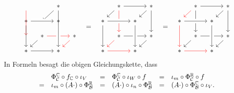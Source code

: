 \documentclass[a4paper,10pt]{article}
\begin{document}
\[\begin{array}{cccccccc}
\begin{tikzcd}[row sep = 10, column sep = 10]
        \arrow[dd, red]
      & {}
      & *
        \arrow[ld]
        \arrow[dd]
      \\
        *
        \arrow[rr, crossing over]
        \arrow[dd]
      & {}
      & *
        \arrow[dd]
      & {}
      \\
        {}
      & *
        \arrow[rr, red]
        \arrow[ld]
      & {}
      & *
        \arrow[ld, red]
      \\
        *
        \arrow[rr]
      & {}
      & *
        \arrow[from=uu, crossing over]
      & {}
    \end{tikzcd}
    & = &
    \begin{tikzcd}[row sep = 10, column sep = 10]
        {}
      & *
        \arrow[rr]
        \arrow[ld]
        \arrow[dd, red]
      & {}
      & *
        \arrow[ld]
        \arrow[dd]
      \\
        *
        \arrow[rr, crossing over]
        \arrow[dd]
      & {}
      & *
        \arrow[dd]
      & {}
      \\
        {}
      & *
        \arrow[rr]
        \arrow[ld,red]
      & {}
      & *
        \arrow[ld]
      \\
        *
        \arrow[rr,red]
      & {}
      & *
        \arrow[from=uu, crossing over]
      & {}
    \end{tikzcd}
    & = &
    \begin{tikzcd}[row sep = 10, column sep = 10]
        {}
      & *
        \arrow[rr]
        \arrow[ld, red]
        \arrow[dd]
      & {}
      & *
        \arrow[ld]
        \arrow[dd]
      \\
        *
        \arrow[rr, crossing over]
        \arrow[dd, red]
      & {}
      & *
        \arrow[dd]
      & {}
      \\
        {}
      & *
        \arrow[rr]
        \arrow[ld]
      & {}
      & *
        \arrow[ld]
      \\
        *
        \arrow[rr,red]
      & {}
      & *
        \arrow[from=uu, crossing over]
      & {}
    \end{tikzcd}
  \end{array}
\]
In Formeln besagt die obigen Gleichungskette, dass
\[
\begin{array}{clclcl}
    & \Phi^{\mathbb{C}}_{\mathcal{C}} \circ f_{\mathbb{C}} \circ \iota_V
  &=&  \Phi^{\mathbb{C}}_{\mathcal{C}} \circ \iota_W \circ f
  &=&  \iota_m \circ \Phi^{\mathbb{R}}_{\mathcal{C}} \circ f \\
   =&  \iota_m \circ (A \cdot) \circ \Phi^{\mathbb{R}}_{\mathcal{B}}
  &=&  (A \cdot) \circ \iota_n \circ \Phi^{\mathbb{R}}_{\mathcal{B}}
  &=&  (A \cdot) \circ \Phi^{\mathbb{C}}_{\mathcal{B}} \circ \iota_V.
\end{array}
\]
\end{document}
